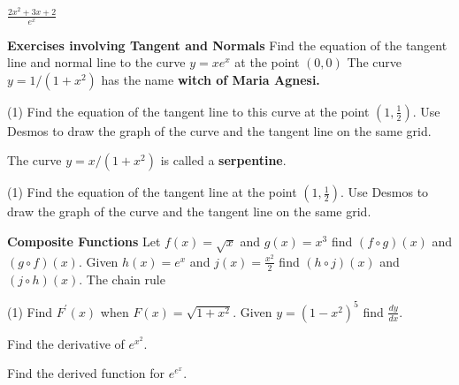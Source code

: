 \begin{Exercise}[title={Rate of Change},label=exRateOfChange]
\begin{Exercise}[title={Product, Quotient, & Chain Rules},label=exPQCRules]
\begin{tasks}
		\task $\frac{2 x^{2} +3 x +2}{e^{x}}$ %
		
\end{tasks}

\textbf{Exercises involving Tangent and Normals}
	\Question Find the equation of the tangent line and normal line to the curve $y =x e^{x}$ at the point $\left (0 ,0\right )$ %
	\Question The curve $y =1/(1 +x^{2})$ has the name \textbf{witch of Maria Agnesi.}
\begin{tasks}(1)
	\task  Find the equation of the tangent line to this curve at the point
	$\left (1 ,\frac{1}{2}\right )$.%
	\task  Use Desmos to draw the graph of the curve and the tangent line on the same grid.
\end{tasks}
	\Question The curve $y =x/(1 +x^{2})$ is called a \textbf{serpentine}. 
\begin{tasks}(1)
	\task  Find the equation of the tangent line at the point $\left (1 ,\frac{1}{2}\right )$.%
	\task  Use Desmos to draw the graph of the curve and the tangent line on the same grid.
\end{tasks}

\textbf{Composite Functions}
\Question Let $f (x) =\sqrt{x}$ and $g (x) =x^{3}$ find $\left (f \circ g\right ) (x)$ and $\left (g \circ f\right ) \left (x\right )$. %
\Question Given $h \left (x\right ) =e^{x}$ and $j (x) =\frac{x^{2}}{2}$ find $\left (h \circ j\right ) (x)$ and $\left (j \circ h\right ) (x)$. %
	\Question The chain rule
\begin{tasks}(1)
	\task Find $F^{ \prime } (x)$ when $F (x) =\sqrt{1 +x^{2}}$. %
	\task Given $y =\left (1 -x^{2}\right )^{5}$ find $\frac{d y}{d x}$. %
	
	\task Find the derivative of $e^{x^{2}}$. %
	
	\task Find the derived function for $e^{e^{x}}$. %
\end{tasks}


\end{Exercise}
\end{Exercise}
